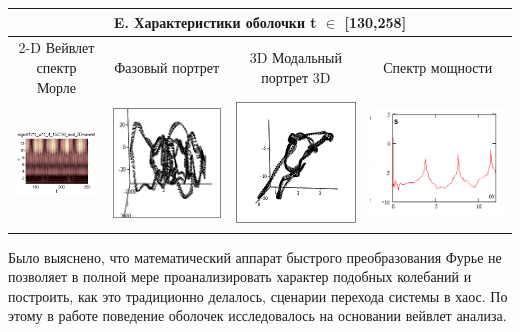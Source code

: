 \documentclass[12pt,letterpaper]{extreport}
\begin{document}
\begin{table}[H]
{\begin{tabular}{|c|c|c|c|}
\multicolumn{4}{|c|}{E. Характеристики оболочки  t 
$\in$ [130,258]}\\

\hline
\footnotesize 2-D Вейвлет спектр Морле&
\footnotesize Фазовый 
портрет&\footnotesize 3D Модальный портрет 3D&
\footnotesize Спектр мощности\\
\hline
	\includegraphics[scale=0.9]{e1} 	
	&	
	\includegraphics[scale=0.9]{e2} 	
	&	
	\includegraphics[scale=0.9]{e3} 
	&
	\includegraphics[scale=0.9]{e4} 
\\
\hline
\end{tabular}

}
\end{table}	
\par Было выяснено, что математический аппарат 
быстрого преобразования Фурье не
позволяет в полной мере проанализировать характер 
подобных колебаний и 
построить, как это традиционно делалось, сценарии 
перехода системы в хаос. По 
этому в работе поведение оболочек исследовалось на 
основании вейвлет анализа.
\end{document}
